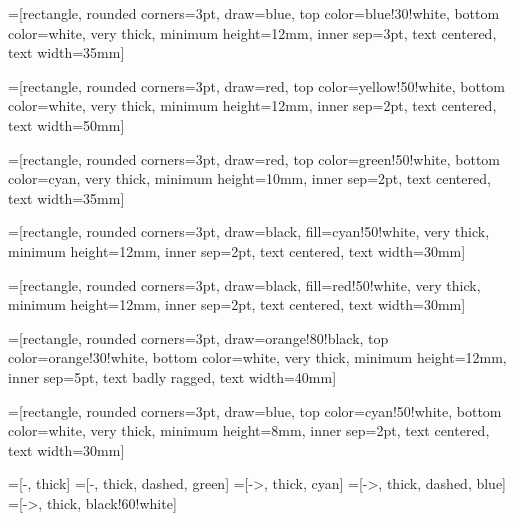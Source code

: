 
%
%

=[rectangle, rounded corners=3pt, draw=blue, top color=blue!30!white, bottom
color=white, very thick, minimum height=12mm, inner sep=3pt, text centered, text width=35mm]

=[rectangle, rounded corners=3pt, draw=red, top color=yellow!50!white, bottom
color=white, very thick, minimum height=12mm, inner sep=2pt, text centered, text width=50mm]

=[rectangle, rounded corners=3pt, draw=red, top color=green!50!white, bottom
color=cyan, very thick, minimum height=10mm, inner sep=2pt, text centered, text width=35mm]

=[rectangle, rounded corners=3pt, draw=black, fill=cyan!50!white, 
 very thick, minimum height=12mm, inner sep=2pt,  text centered, text width=30mm]

=[rectangle, rounded corners=3pt, draw=black, fill=red!50!white, 
 very thick, minimum height=12mm, inner sep=2pt,  text centered, text width=30mm]

=[rectangle, rounded corners=3pt, draw=orange!80!black, top color=orange!30!white,
bottom color=white, very thick, minimum height=12mm, inner sep=5pt, text badly ragged, text width=40mm]

=[rectangle, rounded corners=3pt, draw=blue, top color=cyan!50!white, bottom
color=white, very thick, minimum height=8mm, inner sep=2pt, text centered, text width=30mm]

=[-, thick]
=[-, thick, dashed, green]
=[->, thick, cyan]
=[->, thick, dashed, blue]
=[->, thick,  black!60!white]



